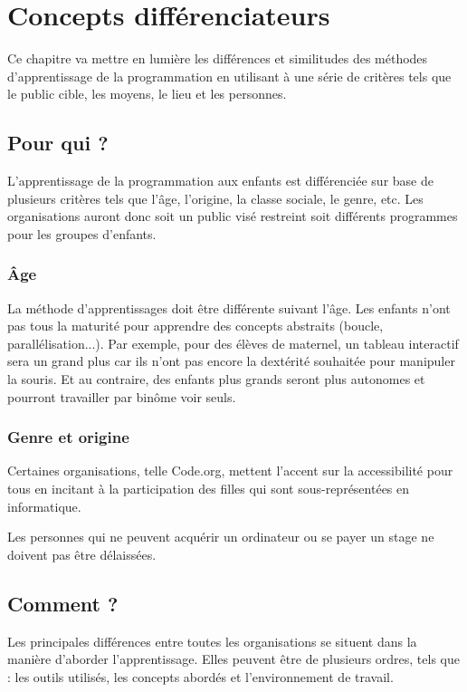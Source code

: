 \section{Concepts différenciateurs}
\label{concepts}
Ce chapitre va mettre en lumière les différences et similitudes des méthodes d'apprentissage de la programmation en utilisant à une série de critères tels que le public cible, les moyens, le lieu et les personnes.
\subsection{Pour qui ?}
L'apprentissage de la programmation aux enfants est différenciée sur base de plusieurs critères tels que l'âge, l'origine, la classe sociale, le genre, etc. Les organisations auront donc soit un public visé restreint soit différents programmes pour les groupes d'enfants. 

\subsubsection{Âge}
La méthode d'apprentissages doit être différente suivant l'âge. Les enfants n'ont pas tous la maturité pour apprendre des concepts abstraits (boucle, parallélisation...). Par exemple, pour des élèves de maternel, un tableau interactif sera un grand plus car ils n'ont pas encore la dextérité souhaitée pour manipuler la souris. Et au contraire, des enfants plus grands seront plus autonomes et pourront travailler par binôme voir seuls.

\subsubsection{Genre et origine}
Certaines organisations, telle Code.org, mettent l'accent sur la accessibilité pour tous en incitant à la participation des filles qui sont sous-représentées en informatique. 

Les personnes qui ne peuvent acquérir un ordinateur ou se payer un stage ne doivent pas être délaissées.

\subsection{Comment ?}
Les principales différences entre toutes les organisations se situent dans la manière d'aborder l'apprentissage. Elles peuvent être de plusieurs ordres, tels que : les outils utilisés, les concepts abordés et l'environnement de travail.

